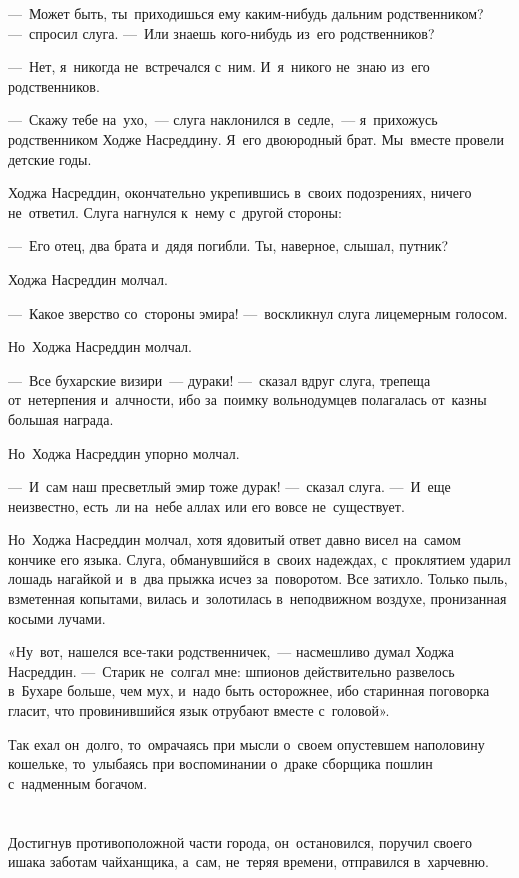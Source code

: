 \documentclass[12pt,a4paper]{book}
\begin{document}
—~Может быть, ты~приходишься ему каким-нибудь дальним родственником? —~спросил слуга. —~Или знаешь кого-нибудь из~его родственников?

—~Нет, я~никогда не~встречался с~ним. И~я~никого не~знаю из~его родственников.

—~Скажу тебе на~ухо,~— слуга наклонился в~седле,~— я~прихожусь родственником Ходже Насреддину. Я~его двоюродный брат. Мы~вместе провели детские годы.

Ходжа Насреддин, окончательно укрепившись в~своих подозрениях, ничего не~ответил. Слуга нагнулся к~нему с~другой стороны:

—~Его отец, два брата и~дядя погибли. Ты, наверное, слышал, путник?

Ходжа Насреддин молчал.

—~Какое зверство со~стороны эмира! —~воскликнул слуга лицемерным голосом.

Но~Ходжа Насреддин молчал.

—~Все бухарские визири~— дураки! —~сказал вдруг слуга, трепеща от~нетерпения и~алчности, ибо за~поимку вольнодумцев полагалась от~казны большая награда.

Но~Ходжа Насреддин упорно молчал.

—~И~сам наш пресветлый эмир тоже дурак! —~сказал слуга. —~И~еще неизвестно, есть~ли на~небе аллах или его вовсе не~существует.

Но~Ходжа Насреддин молчал, хотя ядовитый ответ давно висел на~самом кончике его языка. Слуга, обманувшийся в~своих надеждах, с~проклятием ударил лошадь нагайкой и~в~два прыжка исчез за~поворотом. Все затихло. Только пыль, взметенная копытами, вилась и~золотилась в~неподвижном воздухе, пронизанная косыми лучами.

«Ну~вот, нашелся все-таки родственничек,~— насмешливо думал Ходжа Насреддин. —~Старик не~солгал мне: шпионов действительно развелось в~Бухаре больше, чем мух, и~надо быть осторожнее, ибо старинная поговорка гласит, что провинившийся язык отрубают вместе с~головой».

Так ехал он~долго, то~омрачаясь при мысли о~своем опустевшем наполовину кошельке, то~улыбаясь при воспоминании о~драке сборщика пошлин с~надменным богачом.


\chapter{}

Достигнув противоположной части города, он~остановился, поручил своего ишака заботам чайханщика, а~сам, не~теряя времени, отправился в~харчевню.
\end{document}
